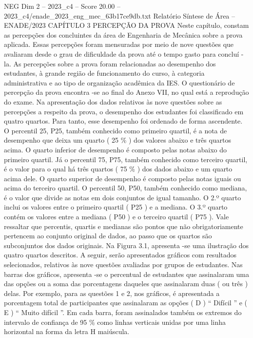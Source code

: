 \begin{textsample}{NEG Dim 2 – 2023\_c4 – Score 20.00 – 2023\_c4/enade\_2023\_eng\_mec\_63b17ce9db.txt}  \label{ex:f2_neg_415}
Relatório Síntese de Área – ENADE/2023 CAPÍTULO 3 PERCEPÇÃO DA PROVA Neste capítulo, constam as percepções dos concluintes da área de Engenharia de Mecânica sobre a prova aplicada.
Essas percepções foram mensuradas por meio de nove questões que avaliaram desde o grau de dificuldade da prova até o tempo gasto para concluí -la.
As percepções sobre a prova foram relacionadas ao desempenho dos estudantes, à grande região de funcionamento do curso, à categoria administrativa e ao tipo de organização acadêmica da IES.
O questionário de percepção da prova encontra -se ao final do Anexo VII, no qual está a reprodução do exame.
Na apresentação dos dados relativos às nove questões sobre as percepções a respeito da prova, o desempenho dos estudantes foi classificado em quatro quartos.
Para tanto, esse desempenho foi ordenado de forma ascendente.
O percentil 25, P25, também conhecido como primeiro quartil, é a nota de desempenho que deixa um quarto ( 25 \% ) dos valores abaixo e três quartos acima.
O quarto inferior de desempenho é composto pelas notas abaixo do primeiro quartil.
Já o percentil 75, P75, também conhecido como terceiro quartil, é o valor para o qual há três quartos ( 75 \% ) dos dados abaixo e um quarto acima dele.
O quarto superior de desempenho é composto pelas notas iguais ou acima do terceiro quartil.
O percentil 50, P50, também conhecido como mediana, é o valor que divide as notas em dois conjuntos de igual tamanho.
O 2.º quarto inclui os valores entre o primeiro quartil ( P25 ) e a mediana.
O 3.º quarto contém os valores entre a mediana ( P50 ) e o terceiro quartil ( P75 ).
Vale ressaltar que percentis, quartis e medianas são pontos que não obrigatoriamente pertencem ao conjunto original de dados, ao passo que os quartos são subconjuntos dos dados originais.
Na Figura 3.1, apresenta -se uma ilustração dos quatro quartos descritos.
A seguir, serão apresentados gráficos com resultados selecionados, relativos às nove questões avaliadas por grupos de estudantes.
Nas barras dos gráficos, apresenta -se o percentual de estudantes que assinalaram uma das opções ou a soma das porcentagens daqueles que assinalaram duas ( ou três ) delas.
Por exemplo, para as questões 1 e 2, nos gráficos, é apresentada a porcentagem total de participantes que assinalaram as opções ( D ) “ Difícil ” e ( E ) “ Muito difícil ”.
Em cada barra, foram assinalados também os extremos do intervalo de confiança de 95 \% como linhas verticais unidas por uma linha horizontal na forma da letra H maiúscula.

\end{textsample}
